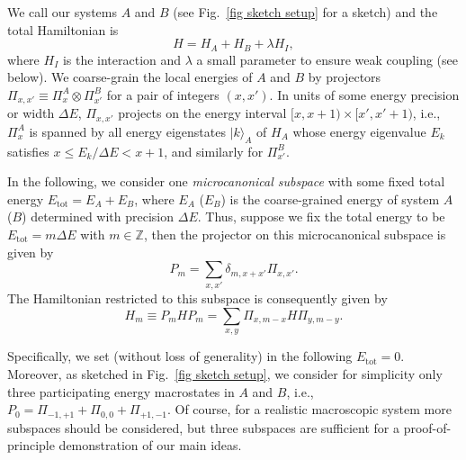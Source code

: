 \documentclass[pre,onecolumn,12pt,aps,longbibliography,nofootinbib]{revtex4-2}
\begin{document}
We call our systems $A$ and $B$ (see Fig.~\ref{fig sketch setup} for a sketch) and the total Hamiltonian is
\begin{equation}\label{eq H mic}
 H = H_A + H_B + \lambda H_I,
\end{equation}
where $H_I$ is the interaction and $\lambda$ a small parameter to ensure weak coupling (see below). We coarse-grain the local energies of $A$ and $B$ by projectors $\Pi_{x,x'} \equiv \Pi_x^A\otimes\Pi_{x'}^B$ for a pair of integers $(x,x')$. In units of some energy precision or width $\Delta E$, $\Pi_{x,x'}$ projects on the energy interval $[x,x+1)\times[x',x'+1)$, i.e., $\Pi_x^A$ is spanned by all energy eigenstates $|k\rangle_A$ of $H_A$ whose energy eigenvalue $E_k$ satisfies $x\le E_k/\Delta E < x+1$, and similarly for $\Pi_{x'}^B$.

In the following, we consider one \emph{microcanonical subspace} with some fixed total energy 
$E_\text{tot} = E_A + E_B$, where $E_A$ ($E_B$) is the coarse-grained energy of system $A$ ($B$) determined with 
precision $\Delta E$. Thus, suppose we fix the total energy to be $E_\text{tot} = m\Delta E$ with $m\in\mathbb{Z}$, 
then the projector on this microcanonical subspace is given by
\begin{equation}
 P_{m} = \sum_{x,x'} \delta_{m,x+x'}\Pi_{x,x'}.
\end{equation}
The Hamiltonian restricted to this subspace is consequently given by
\begin{equation}\label{eq H rest}
 H_m \equiv P_{m} H P_{m} = \sum_{x,y} \Pi_{x,m-x} H \Pi_{y,m-y}.
\end{equation}

Specifically, we set (without loss of generality) in the following $E_\text{tot} = 0$. Moreover, as sketched in Fig.~\ref{fig sketch setup}, we consider for simplicity only three participating energy macrostates in $A$ and $B$, i.e., $P_0 = \Pi_{-1,+1} + \Pi_{0,0} + \Pi_{+1,-1}$. Of course, for a realistic macroscopic system more subspaces should be considered, but three subspaces are sufficient for a proof-of-principle demonstration of our main ideas.
\end{document}
